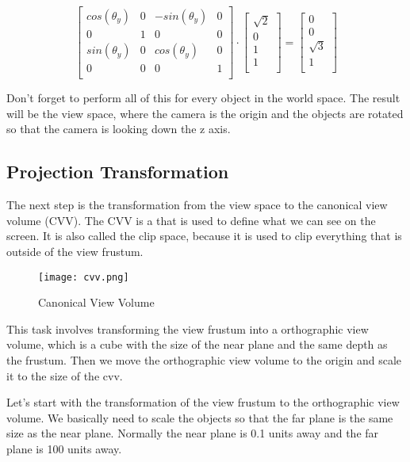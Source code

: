 \documentclass[12pt]{report} \usepackage{preamble}
\begin{document}
\[
	\begin{bmatrix}
		cos(\theta_y) & 0 & -sin(\theta_y) & 0 \\
		0             & 1 & 0              & 0 \\
		sin(\theta_y) & 0 & cos(\theta_y)  & 0 \\
		0             & 0 & 0              & 1 \\
	\end{bmatrix}
	\cdot
	\begin{bmatrix}
		\sqrt{2} \\
		0        \\
		1        \\
		1        \\
	\end{bmatrix}
	=
	\begin{bmatrix}
		0        \\
		0        \\
		\sqrt{3} \\
		1        \\
	\end{bmatrix}
\]

Don't forget to perform all of this for every object in the world space.
The result will be the view space, where the camera is the origin and
the objects are rotated so that the camera is looking down the z axis.

\subsection{Projection Transformation}

The next step is the transformation from the view space to the canonical
view volume (CVV). The CVV is a that is used to define what we can see
on the screen. It is also called the clip space, because it is used to
clip everything that is outside of the view frustum.

\begin{figure}[hbtp]
	\centering \texttt{[image: cvv.png]}
	\caption{Canonical View Volume \cite{fig:cvv}}
\end{figure} \FloatBarrier

This task involves transforming the view frustum into a orthographic view
volume, which is a cube with the size of the near plane and the same depth
as the frustum. Then we move the orthographic view volume to the origin
and scale it to the size of the cvv.

Let's start with the transformation of the view frustum to the orthographic
view volume. We basically need to scale the objects so that the far plane is
the same size as the near plane. Normally the near plane is 0.1 units away and the far
plane is 100 units away.
\end{document}
